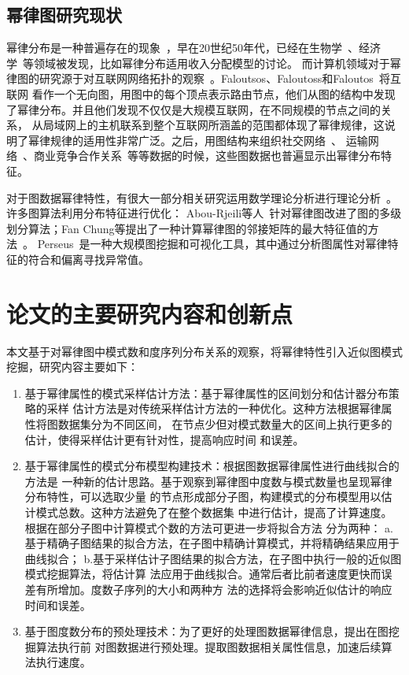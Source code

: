 \documentclass[master]{thesis-uestc}
\begin{document}
\subsection{幂律图研究现状}
    幂律分布是一种普遍存在的现象~\cite{PowerlawBrief}，早在20世纪50年代，已经在生物学~\cite{Stochastic}、经济学~\cite{Zipf}等领域被发现，比如幂律分布适用收入分配模型的讨论。
而计算机领域对于幂律图的研究源于对互联网网络拓扑的观察~\cite{Statistical}。Faloutsos、Faloutoss和Faloutos~\cite{faloutsos1999powerlaw}将互联网
看作一个无向图，用图中的每个顶点表示路由节点，他们从图的结构中发现了幂律分布。并且他们发现不仅仅是大规模互联网，在不同规模的节点之间的关系，
从局域网上的主机联系到整个互联网所涵盖的范围都体现了幂律规律，这说明了幂律规律的适用性非常广泛。之后，用图结构来组织社交网络~\cite{Characterization}、
运输网络~\cite{Transportation}、商业竞争合作关系~\cite{Company}等等数据的时候，这些图数据也普遍显示出幂律分布特征。

    对于图数据幂律特性，有很大一部分相关研究运用数学理论分析进行理论分析~\cite{clauset2007powerlaw}。许多图算法利用分布特征进行优化：
Abou-Rjeili等人~\cite{MultilevelPartitioning}针对幂律图改进了图的多级划分算法；Fan Chung等提出了一种计算幂律图的邻接矩阵的最大特征值的方法~\cite{Eigenvalues}。
Perseus~\cite{Perseus}是一种大规模图挖掘和可视化工具，其中通过分析图属性对幂律特征的符合和偏离寻找异常值。

\section{论文的主要研究内容和创新点}
    本文基于对幂律图中模式数和度序列分布关系的观察，将幂律特性引入近似图模式挖掘，研究内容主要如下：
\begin{enumerate}
    \item 基于幂律属性的模式采样估计方法：基于幂律属性的区间划分和估计器分布策略的采样
    估计方法是对传统采样估计方法的一种优化。这种方法根据幂律属性将图数据集分为不同区间，
    在节点少但对模式数量大的区间上执行更多的估计，使得采样估计更有针对性，提高响应时间
    和误差。
    \item 基于幂律属性的模式分布模型构建技术：根据图数据幂律属性进行曲线拟合的方法是
    一种新的估计思路。基于观察到幂律图中度数与模式数量也呈现幂律分布特性，可以选取少量
    的节点形成部分子图，构建模式的分布模型用以估计模式总数。这种方法避免了在整个数据集
    中进行估计，提高了计算速度。根据在部分子图中计算模式个数的方法可更进一步将拟合方法
    分为两种：
    a.基于精确子图结果的拟合方法，在子图中精确计算模式，并将精确结果应用于曲线拟合；
    b.基于采样估计子图结果的拟合方法，在子图中执行一般的近似图模式挖掘算法，将估计算
    法应用于曲线拟合。通常后者比前者速度更快而误差有所增加。度数子序列的大小和两种方
    法的选择将会影响近似估计的响应时间和误差。
    \item 基于图度数分布的预处理技术：为了更好的处理图数据幂律信息，提出在图挖掘算法执行前
    对图数据进行预处理。提取图数据相关属性信息，加速后续算法执行速度。
\end{enumerate}
    
\end{document}

